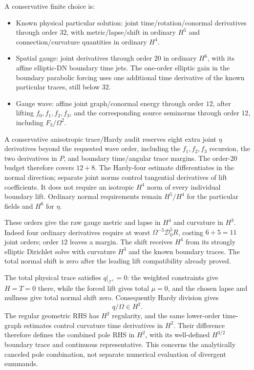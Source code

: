 \documentclass[11pt]{article}
\newcommand{\scri}{\mathscr I^+}
\begin{document}
A conservative finite choice is:
\begin{itemize}
\item Known physical particular solution: joint time/rotation/conormal derivatives through order $32$, with metric/lapse/shift in ordinary $H^5$ and connection/curvature quantities in ordinary $H^4$.
\item Spatial gauge: joint derivatives through order $20$ in ordinary $H^6$, with its affine elliptic-DN boundary time jets. The one-order elliptic gain in the boundary parabolic forcing uses one additional time derivative of the known particular traces, still below $32$.
\item Gauge wave: affine joint graph/conormal energy through order $12$, after lifting $f_0,f_1,f_2,f_3$, and the corresponding source seminorms through order $12$, including $F_3/\Omega^2$.
\end{itemize}
A conservative anisotropic trace/Hardy audit reserves eight extra joint $\eta$ derivatives beyond the requested wave order, including the $f_1,f_2,f_3$ recursion, the two derivatives in $P$, and boundary time/angular trace margins. The order-$20$ budget therefore covers $12+8$. The Hardy-four estimate differentiates in the normal direction; separate joint norms control tangential derivatives of lift coefficients. It does not require an isotropic $H^4$ norm of every individual boundary lift. Ordinary normal requirements remain $H^5/H^4$ for the particular fields and $H^6$ for $\eta$.

These orders give the raw gauge metric and lapse in $H^4$ and curvature in $H^3$. Indeed four ordinary derivatives require at worst $\Omega^{-3}\mathcal D_0^5R$, costing $6+5=11$ joint orders; order $12$ leaves a margin. The shift receives $H^4$ from its strongly elliptic Dirichlet solve with curvature $H^3$ and the known boundary traces. The total normal shift is zero after the leading lift compatibility already proved.

The total physical trace satisfies $q|_{\scri}=0$: the weighted constraints give $H=T=0$ there, while the forced lift gives total $\mu=0$, and the chosen lapse and nullness give total normal shift zero. Consequently Hardy division gives
\[
 q/\Omega\in H^2.
\]
The regular geometric RHS has $H^2$ regularity, and the same lower-order time-graph estimates control curvature time derivatives in $H^2$. Their difference therefore defines the combined pole RHS in $H^2$, with its well-defined $H^{3/2}$ boundary trace and continuous representative. This concerns the analytically canceled pole combination, not separate numerical evaluation of divergent summands.
\end{document}
